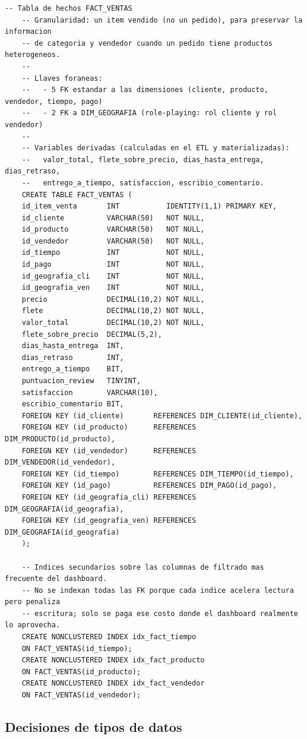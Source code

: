 \documentclass[11pt,a4paper]{article}
\begin{document}
\begin{lstlisting}[caption={Creacion de la tabla de hechos y sus indices.}]
	-- Tabla de hechos FACT_VENTAS
	-- Granularidad: un item vendido (no un pedido), para preservar la informacion
	-- de categoria y vendedor cuando un pedido tiene productos heterogeneos.
	--
	-- Llaves foraneas:
	--   - 5 FK estandar a las dimensiones (cliente, producto, vendedor, tiempo, pago)
	--   - 2 FK a DIM_GEOGRAFIA (role-playing: rol cliente y rol vendedor)
	--
	-- Variables derivadas (calculadas en el ETL y materializadas):
	--   valor_total, flete_sobre_precio, dias_hasta_entrega, dias_retraso,
	--   entrego_a_tiempo, satisfaccion, escribio_comentario.
	CREATE TABLE FACT_VENTAS (
	id_item_venta       INT           IDENTITY(1,1) PRIMARY KEY,
	id_cliente          VARCHAR(50)   NOT NULL,
	id_producto         VARCHAR(50)   NOT NULL,
	id_vendedor         VARCHAR(50)   NOT NULL,
	id_tiempo           INT           NOT NULL,
	id_pago             INT           NOT NULL,
	id_geografia_cli    INT           NOT NULL,
	id_geografia_ven    INT           NOT NULL,
	precio              DECIMAL(10,2) NOT NULL,
	flete               DECIMAL(10,2) NOT NULL,
	valor_total         DECIMAL(10,2) NOT NULL,
	flete_sobre_precio  DECIMAL(5,2),
	dias_hasta_entrega  INT,
	dias_retraso        INT,
	entrego_a_tiempo    BIT,
	puntuacion_review   TINYINT,
	satisfaccion        VARCHAR(10),
	escribio_comentario BIT,
	FOREIGN KEY (id_cliente)       REFERENCES DIM_CLIENTE(id_cliente),
	FOREIGN KEY (id_producto)      REFERENCES DIM_PRODUCTO(id_producto),
	FOREIGN KEY (id_vendedor)      REFERENCES DIM_VENDEDOR(id_vendedor),
	FOREIGN KEY (id_tiempo)        REFERENCES DIM_TIEMPO(id_tiempo),
	FOREIGN KEY (id_pago)          REFERENCES DIM_PAGO(id_pago),
	FOREIGN KEY (id_geografia_cli) REFERENCES DIM_GEOGRAFIA(id_geografia),
	FOREIGN KEY (id_geografia_ven) REFERENCES DIM_GEOGRAFIA(id_geografia)
	);
	
	-- Indices secundarios sobre las columnas de filtrado mas frecuente del dashboard.
	-- No se indexan todas las FK porque cada indice acelera lectura pero penaliza
	-- escritura; solo se paga ese costo donde el dashboard realmente lo aprovecha.
	CREATE NONCLUSTERED INDEX idx_fact_tiempo
	ON FACT_VENTAS(id_tiempo);
	CREATE NONCLUSTERED INDEX idx_fact_producto
	ON FACT_VENTAS(id_producto);
	CREATE NONCLUSTERED INDEX idx_fact_vendedor
	ON FACT_VENTAS(id_vendedor);
\end{lstlisting}

\subsection{Decisiones de tipos de datos}
\end{document}
